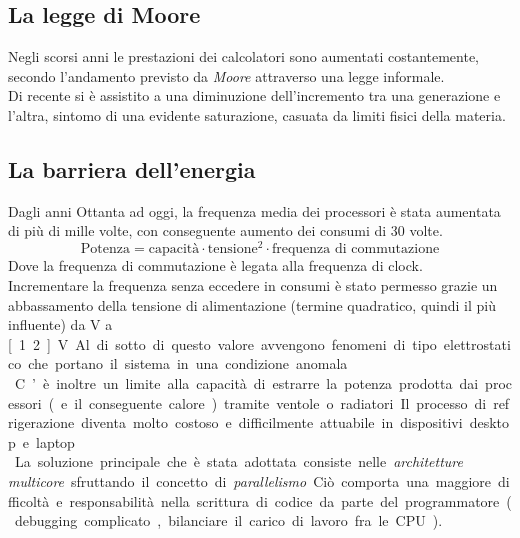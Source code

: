 \documentclass[class=book, crop=false]{standalone}
\begin{document}
\subsection{La legge di Moore}
Negli scorsi anni le prestazioni dei calcolatori sono aumentati costantemente, secondo l'andamento previsto da \emph{Moore} attraverso una legge informale.\\
Di recente si è assistito a una diminuzione dell’incremento tra una generazione e l’altra, sintomo di una evidente saturazione, casuata da limiti fisici della materia.

\subsection{La barriera dell'energia}
Dagli anni Ottanta ad oggi, la frequenza media dei processori è stata aumentata di più di mille volte, con conseguente aumento dei consumi di 30 volte.
\begin{equation*}
\text{Potenza} = \text{capacità}\cdot \text{tensione}^2\cdot \text{frequenza di commutazione}
\end{equation*}
Dove la frequenza di commutazione è legata alla frequenza di clock.\\
Incrementare la frequenza senza eccedere in consumi è stato permesso grazie un abbassamento della tensione di alimentazione (termine quadratico, quindi il più influente) da \unit[5]{V} a \unit[1.2]{V}. Al di sotto di questo valore avvengono fenomeni di tipo elettrostatico che portano il sistema in una condizione anomala.\\
C’è inoltre un limite alla capacità di estrarre la potenza prodotta dai processori (e il conseguente calore) tramite ventole o radiatori. Il processo di refrigerazione diventa molto
costoso e difficilmente attuabile in dispositivi desktop e laptop.\\

La soluzione principale che è stata adottata consiste nelle \emph{architetture multicore} sfruttando il concetto di \emph{parallelismo}. Ciò comporta una maggiore difficoltà e responsabilità nella scrittura di codice da parte del programmatore (debugging complicato, bilanciare il carico di lavoro fra le CPU).
\end{document}

